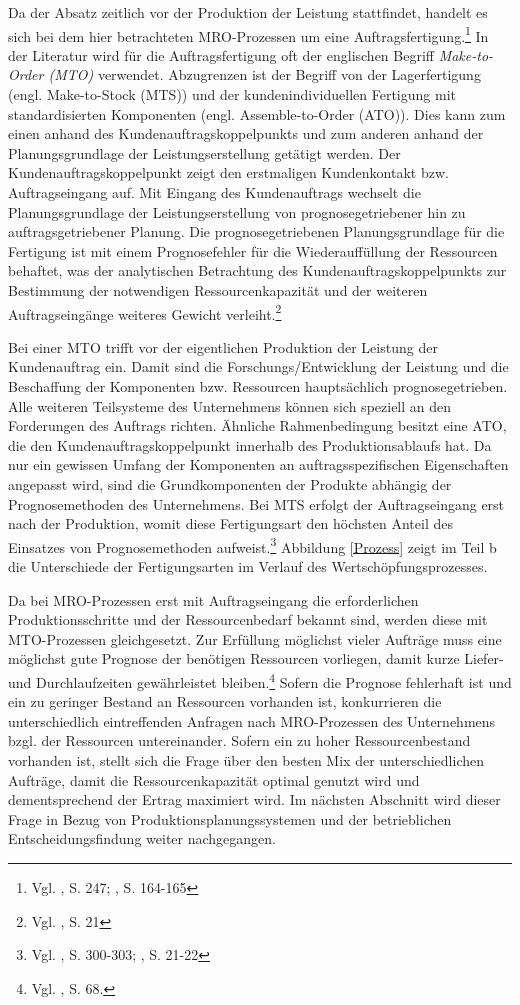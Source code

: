 Da der Absatz zeitlich vor der Produktion der Leistung stattfindet, handelt es sich bei dem hier betrachteten MRO-Prozessen um eine Auftragsfertigung.\footnote{Vgl. \cite{hax1956industriebetrieb}, S. 247; \cite{Gutenberg1965dispos}, S. 164-165} In der Literatur wird für die Auftragsfertigung oft der englischen Begriff \textit{Make-to-Order (MTO)} verwendet. Abzugrenzen ist der Begriff von der Lagerfertigung (engl. Make-to-Stock (MTS)) und der kundenindividuellen Fertigung mit standardisierten Komponenten (engl. Assemble-to-Order (ATO)). 
Dies kann zum einen anhand des Kundenauftragskoppelpunkts und zum anderen anhand der Planungsgrundlage der Leistungserstellung getätigt werden. Der Kundenauftragskoppelpunkt zeigt den erstmaligen Kundenkontakt bzw. Auftragseingang auf. Mit Eingang des Kundenauftrags wechselt die Planungsgrundlage der Leistungserstellung von prognosegetriebener hin zu auftragsgetriebener Planung. Die prognosegetriebenen Planungsgrundlage für die Fertigung ist mit einem Prognosefehler für die Wiederauffüllung der Ressourcen behaftet, was der analytischen Betrachtung des Kundenauftragskoppelpunkts zur Bestimmung der notwendigen Ressourcenkapazität und der weiteren Auftragseingänge weiteres Gewicht verleiht.\footnote{Vgl. \cite{quante2009management}, S. 21} 

Bei einer MTO trifft vor der eigentlichen Produktion der Leistung der Kundenauftrag ein. Damit sind die Forschungs/Entwicklung der Leistung und die Beschaffung der Komponenten bzw. Ressourcen hauptsächlich prognosegetrieben. Alle weiteren Teilsysteme des Unternehmens können sich speziell an den Forderungen des Auftrags richten. Ähnliche Rahmenbedingung besitzt eine ATO, die den Kundenauftragskoppelpunkt innerhalb des Produktionsablaufs hat. Da nur ein gewissen Umfang der Komponenten an auftragsspezifischen Eigenschaften angepasst wird, sind die Grundkomponenten der Produkte abhängig der Prognosemethoden des Unternehmens. Bei MTS erfolgt der Auftragseingang erst nach der Produktion, womit diese Fertigungsart den höchsten Anteil des Einsatzes von Prognosemethoden aufweist.\footnote{Vgl. \cite{fleischmeyr2004codp}, S. 300-303; \cite{quante2009management}, S. 21-22} Abbildung \ref{Prozess} zeigt im Teil b die Unterschiede der Fertigungsarten im Verlauf des Wertschöpfungsprozesses. 

Da bei MRO-Prozessen erst mit Auftragseingang die erforderlichen Produktionsschritte und der Ressourcenbedarf bekannt sind, werden diese mit MTO-Prozessen gleichgesetzt. Zur Erfüllung möglichst vieler Aufträge muss eine möglichst gute Prognose der benötigen Ressourcen vorliegen, damit kurze Liefer- und Durchlaufzeiten gewährleistet bleiben.\footnote{Vgl. \cite{thaler2001supply}, S. 68.} Sofern die Prognose fehlerhaft ist und ein zu geringer Bestand an Ressourcen vorhanden ist, konkurrieren die unterschiedlich eintreffenden Anfragen nach MRO-Prozessen des Unternehmens bzgl. der Ressourcen untereinander. Sofern ein zu hoher Ressourcenbestand vorhanden ist, stellt sich die Frage über den besten Mix der unterschiedlichen Aufträge, damit die Ressourcenkapazität optimal genutzt wird und dementsprechend der Ertrag maximiert wird. Im nächsten Abschnitt wird dieser Frage in Bezug von Produktionsplanungssystemen und der betrieblichen Entscheidungsfindung weiter nachgegangen.


